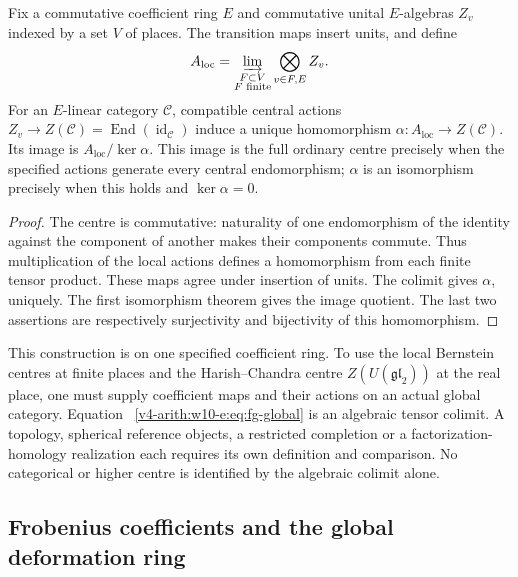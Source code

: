 \begin{proposition}
\label{v4-arith:w10-e:thm:fg-discrete-glue}
Fix a commutative coefficient ring $E$ and commutative unital
$E$-algebras $Z_v$ indexed by a set $V$ of places. The transition maps
insert units, and define
\begin{equation}
\label{v4-arith:w10-e:eq:fg-global}
 A_{\mathrm{loc}}=\varinjlim_{\substack{F\subset V\\F\text{ finite}}}
       \bigotimes_{v\in F,E} Z_v.
\end{equation}
For an $E$-linear category $\mathcal C$, compatible central actions
$Z_v\to Z(\mathcal C)=\operatorname{End}(\operatorname{id}_{\mathcal C})$
induce a unique homomorphism $\alpha:A_{\mathrm{loc}}\to Z(\mathcal C)$.
Its image is $A_{\mathrm{loc}}/\ker\alpha$. This image is the full
ordinary centre precisely when the specified actions generate every
central endomorphism; $\alpha$ is an isomorphism precisely when this
holds and $\ker\alpha=0$.
\end{proposition}
\begin{proof}
The centre is commutative: naturality of one endomorphism of the
identity against the component of another makes their components
commute. Thus multiplication of the local actions defines a homomorphism
from each finite tensor product. These maps agree under insertion of
units. The colimit gives $\alpha$, uniquely. The first isomorphism
theorem gives the image quotient. The last two assertions are respectively
surjectivity and bijectivity of this homomorphism.
\end{proof}

This construction is on one specified coefficient ring. To use the
local Bernstein centres at finite places and the Harish--Chandra centre
$Z(U(\mathfrak{gl}_2))$ at the real place, one must supply coefficient
maps and their actions on an actual global category. Equation~
\eqref{v4-arith:w10-e:eq:fg-global} is an algebraic tensor colimit.
A topology, spherical reference objects, a restricted completion or a
factorization-homology realization each requires its own definition and
comparison. No categorical or higher centre is identified by the
algebraic colimit alone.

\subsection{Frobenius coefficients and the global deformation ring}

